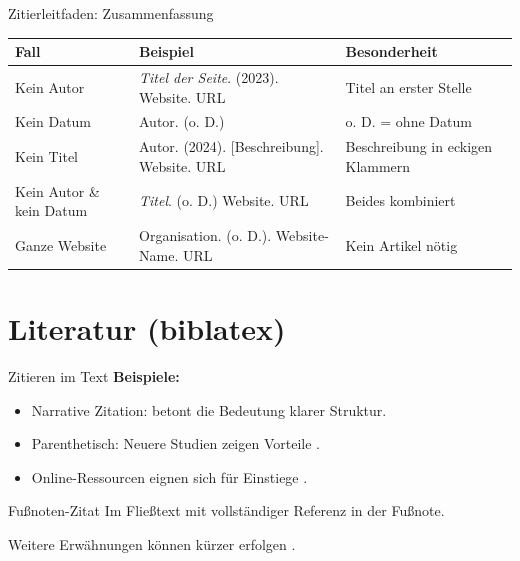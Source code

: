 \documentclass[aspectratio=169,10pt]{beamer}
\begin{document}
\begin{frame}{Zitierleitfaden: Zusammenfassung}
\small
\begin{table}
  \centering
  \begin{tabular}{>{\raggedright\arraybackslash}p{} >{\raggedright\arraybackslash}p{} >{\raggedright\arraybackslash}p{}}
    \toprule
    \textbf{Fall} & \textbf{Beispiel} & \textbf{Besonderheit} \\
    \midrule
    Kein Autor & \textit{Titel der Seite}. (2023). Website. URL & Titel an erster Stelle \\
    Kein Datum & Autor. (o. D.) & o. D. = ohne Datum \\
    Kein Titel & Autor. (2024). {[}Beschreibung{]}. Website. URL & Beschreibung in eckigen Klammern \\
    Kein Autor \& kein Datum & \textit{Titel}. (o. D.) Website. URL & Beides kombiniert \\
    Ganze Website & Organisation. (o. D.). Website-Name. URL & Kein Artikel nötig \\
    \bottomrule
  \end{tabular}
\end{table}
\end{frame}

\section{Literatur (biblatex)}
\begin{frame}{Zitieren im Text}
\small
\textbf{Beispiele:}
\begin{itemize}
  \item Narrative Zitation: \textcite{mueller2024} betont die Bedeutung klarer Struktur.
  \item Parenthetisch: Neuere Studien zeigen Vorteile \parencite{schmidt2023}.
  \item Online-Ressourcen eignen sich f\"ur Einstiege \parencite{beispielOnline}.
\end{itemize}
\end{frame}

\begin{frame}{Fu\ss{}noten-Zitat}
Im Flie\ss{}text mit vollst\"andiger Referenz in der Fu\ss{}note.

\vspace{0.5\baselineskip}
Weitere Erw\"ahnungen k\"onnen k\"urzer erfolgen \parencite{mueller2024, schmidt2023}.
\end{frame}
\end{document}
